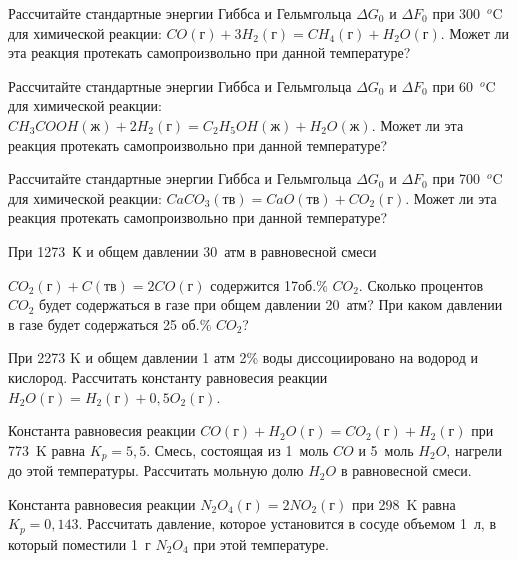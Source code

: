 \begin{Task}
Рассчитайте стандартные энергии Гиббса и Гельмгольца $\Delta G_{0}$ и $\Delta F_{0}$ при 300~$^{o}$C для химической реакции:
$CO(\textrm{г}) + 3H_{2}(\textrm{г}) = CH_{4}(\textrm{г}) + H_{2}O(\textrm{г}).$
Может ли эта реакция протекать самопроизвольно при данной температуре? 
\end{Task}
\begin{Task}
Рассчитайте стандартные энергии Гиббса и Гельмгольца $\Delta G_{0}$ и $\Delta F_{0}$ при 60~$^{o}$C для химической реакции:
$CH_{3}COOH(\textrm{ж}) + 2H_{2}(\textrm{г}) = C_{2}H_{5}OH(\textrm{ж}) + H_{2}O(\textrm{ж})$.
Может ли эта реакция протекать самопроизвольно при данной температуре? 
\end{Task}
\begin{Task}
Рассчитайте стандартные энергии Гиббса и Гельмгольца $\Delta G_{0}$ и $\Delta F_{0}$ при 700~$^{o}$C для химической реакции:
$CaCO_{3}(\textrm{тв}) = CaO(\textrm{тв}) + CO_{2}(\textrm{г})$. 
Может ли эта реакция протекать самопроизвольно при данной температуре? 
\end{Task}
\begin{Task}
При 1273~К и общем давлении 30~атм в равновесной смеси

$CO_{2}(\textrm{г}) + C(\textrm{тв}) = 2CO(\textrm{г})$ 
содержится 17об.\% $CO_{2}$. Сколько процентов $CO_{2}$ будет содержаться в газе при общем давлении 20~атм? При каком давлении в газе будет содержаться 25 об.\% $CO_{2}$?
\end{Task}
\begin{Task}
При 2273 K и общем давлении 1 атм 2\% воды диссоциировано на водород и кислород. Рассчитать константу равновесия реакции
$H_{2}O(\textrm{г}) = H_{2}(\textrm{г}) + 0,5O_{2}(\textrm{г})$.
\end{Task}
\begin{Task}
Константа равновесия реакции
$CO(\textrm{г}) + H_{2}O(\textrm{г}) = CO_{2}(\textrm{г}) + H_{2}(\textrm{г})$
при 773~K равна $K_{p}=5,5$. Смесь, состоящая из 1~моль $CO$ и 5~моль $H_{2}O$, нагрели до этой температуры. Рассчитать мольную долю $H_{2}O$ в равновесной смеси.
\end{Task}
\begin{Task}
Константа равновесия реакции
$N_{2}O_{4}(\textrm{г}) = 2NO_{2}(\textrm{г})$
при 298~K равна\\ $K_{p} = 0,143$. Рассчитать давление, которое установится в сосуде объемом 1~л, в который поместили 1~г $N_{2}O_{4}$ при этой температуре.
\end{Task}
